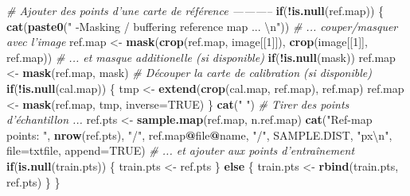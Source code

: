 \documentclass[a4paper, notitlepage, 12pt, krantz2]{krantz}
\newenvironment{Shaded}{\begin{snugshade}}{\end{snugshade}}
\newcommand{\CharTok}[1]{\textcolor[rgb]{0.31,0.60,0.02}{#1}}
\newcommand{\CommentTok}[1]{\textcolor[rgb]{0.56,0.35,0.01}{\textit{#1}}}
\newcommand{\ControlFlowTok}[1]{\textcolor[rgb]{0.13,0.29,0.53}{\textbf{#1}}}
\newcommand{\DataTypeTok}[1]{\textcolor[rgb]{0.13,0.29,0.53}{#1}}
\newcommand{\DecValTok}[1]{\textcolor[rgb]{0.00,0.00,0.81}{#1}}
\newcommand{\KeywordTok}[1]{\textcolor[rgb]{0.13,0.29,0.53}{\textbf{#1}}}
\newcommand{\NormalTok}[1]{#1}
\newcommand{\OperatorTok}[1]{\textcolor[rgb]{0.81,0.36,0.00}{\textbf{#1}}}
\newcommand{\OtherTok}[1]{\textcolor[rgb]{0.56,0.35,0.01}{#1}}
\newcommand{\StringTok}[1]{\textcolor[rgb]{0.31,0.60,0.02}{#1}}
\begin{document}
\begin{Shaded}
\begin{Highlighting}[]
  \CommentTok{# Ajouter des points d'une carte de référence -----------}
  \ControlFlowTok{if}\NormalTok{(}\OperatorTok{!}\KeywordTok{is.null}\NormalTok{(ref.map)) \{}
    \KeywordTok{cat}\NormalTok{(}\KeywordTok{paste0}\NormalTok{(}\StringTok{"    -Masking / buffering reference map ... }\CharTok{\textbackslash{}n}\StringTok{"}\NormalTok{))}
    \CommentTok{# ... couper/masquer avec l'image}
\NormalTok{    ref.map  <-}\StringTok{ }\KeywordTok{mask}\NormalTok{(}\KeywordTok{crop}\NormalTok{(ref.map, image[[}\DecValTok{1}\NormalTok{]]), }\KeywordTok{crop}\NormalTok{(image[[}\DecValTok{1}\NormalTok{]], ref.map)) }
    \CommentTok{# ... et masque additionelle (si disponible)}
    \ControlFlowTok{if}\NormalTok{(}\OperatorTok{!}\KeywordTok{is.null}\NormalTok{(mask)) ref.map <-}\StringTok{ }\KeywordTok{mask}\NormalTok{(ref.map, mask)             }
    \CommentTok{# Découper la carte de calibration (si disponible)}
    \ControlFlowTok{if}\NormalTok{(}\OperatorTok{!}\KeywordTok{is.null}\NormalTok{(cal.map)) \{}
\NormalTok{      tmp <-}\StringTok{ }\KeywordTok{extend}\NormalTok{(}\KeywordTok{crop}\NormalTok{(cal.map, ref.map), ref.map)}
\NormalTok{      ref.map <-}\StringTok{ }\KeywordTok{mask}\NormalTok{(ref.map, tmp, }\DataTypeTok{inverse=}\OtherTok{TRUE}\NormalTok{)}
\NormalTok{    \}}
    \KeywordTok{cat}\NormalTok{(}\StringTok{"    "}\NormalTok{)}
    \CommentTok{# Tirer des points d'échantillon ...}
\NormalTok{    ref.pts <-}\StringTok{ }\KeywordTok{sample.map}\NormalTok{(ref.map, n.ref.map)}
    \KeywordTok{cat}\NormalTok{(}\StringTok{"Ref-map points: "}\NormalTok{, }\KeywordTok{nrow}\NormalTok{(ref.pts), }\StringTok{"/"}\NormalTok{, ref.map}\OperatorTok{@}\NormalTok{file}\OperatorTok{@}\NormalTok{name, }\StringTok{"/"}\NormalTok{, }
\NormalTok{        SAMPLE.DIST, }\StringTok{"px}\CharTok{\textbackslash{}n}\StringTok{"}\NormalTok{, }\DataTypeTok{file=}\NormalTok{txtfile, }\DataTypeTok{append=}\OtherTok{TRUE}\NormalTok{)}
    \CommentTok{# ... et ajouter aux points d'entraînement}
    \ControlFlowTok{if}\NormalTok{(}\KeywordTok{is.null}\NormalTok{(train.pts)) \{}
\NormalTok{      train.pts <-}\StringTok{ }\NormalTok{ref.pts                                          }
\NormalTok{    \} }\ControlFlowTok{else}\NormalTok{ \{}
\NormalTok{      train.pts <-}\StringTok{ }\KeywordTok{rbind}\NormalTok{(train.pts, ref.pts)}
\NormalTok{    \}}
\NormalTok{  \}}
  

\end{Highlighting}
\end{Shaded}
\end{document}
